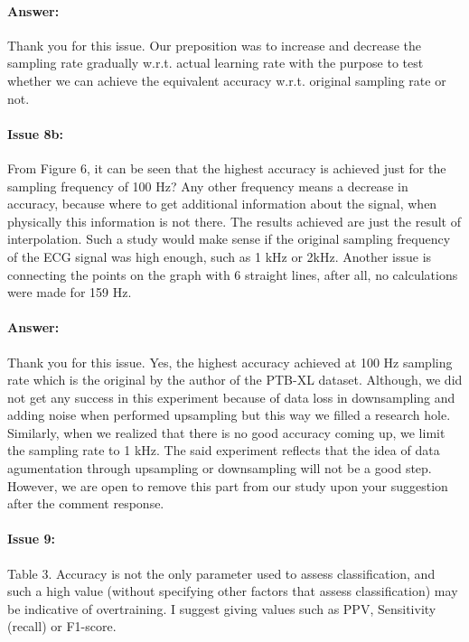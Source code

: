 \documentclass{article}
\begin{document}
\paragraph{Answer:}
Thank you for this issue. Our preposition was to increase and decrease the sampling rate gradually w.r.t. actual learning rate with the purpose to test whether we can achieve the equivalent accuracy w.r.t. original sampling rate or not.  

\paragraph{Issue 8b:}
\begin{displayquote}
From Figure 6, it can be seen that the highest accuracy is achieved just for the sampling frequency of 100 Hz? Any other frequency means a decrease in accuracy, because where to get additional information about the signal, when physically this information is not there. The results achieved are just the result of interpolation. Such a study would make sense if the original sampling frequency of the ECG signal was high enough, such as 1 kHz or 2kHz. Another issue is connecting the points on the graph with 6 straight lines, after all, no calculations were made for 159 Hz.
\end{displayquote}

\paragraph{Answer:}
Thank you for this issue. Yes, the highest accuracy achieved at 100 Hz sampling rate which is the original by the author of the PTB-XL dataset. Although, we did not get any success in this experiment because of data loss in downsampling and adding noise when performed upsampling but this way we filled a research hole. Similarly, when we realized that there is no good accuracy coming up, we limit the sampling rate to 1 kHz. The said experiment reflects that the idea of data agumentation through upsampling or downsampling will not be a good step. However, we are open to remove this part from our study upon your suggestion after the comment response. 

\paragraph{Issue 9:}
\begin{displayquote}
Table 3. Accuracy is not the only parameter used to assess classification, and such a high value (without specifying other factors that assess classification) may be indicative of overtraining. I suggest giving values such as PPV, Sensitivity (recall) or F1-score.
\end{displayquote}
\end{document}
